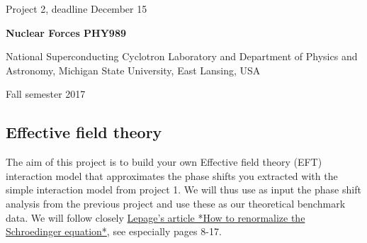 \documentclass[%
oneside,                 %
final,                   %
10pt]{article}
\begin{document}

\newcommand{\exercisesection}[1]{\subsection*{#1}}






\thispagestyle{empty}

\begin{center}
{\LARGE\bf
\begin{spacing}{1.25}
Project 2, deadline  December 15
\end{spacing}
}
\end{center}


\begin{center}
{\bf Nuclear Forces PHY989}
\end{center}

    \begin{center}
\centerline{{\small National Superconducting Cyclotron Laboratory and Department of Physics and Astronomy, Michigan State University, East Lansing, USA}}
\end{center}
    

\begin{center}
Fall semester 2017
\end{center}

\vspace{1cm}


\subsection{Effective field theory}

The aim of this project is to build your own Effective field theory
(EFT) interaction model that approximates the phase shifts you
extracted with the simple interaction model from project 1. We will
thus use as input the phase shift analysis from the previous project
and use these as our theoretical benchmark data.  We will follow closely
\href{{https://arxiv.org/abs/nucl-th/9706029}}{Lepage's article *How to renormalize the Schroedinger
equation*}, see especially
pages 8-17.
\end{document}
